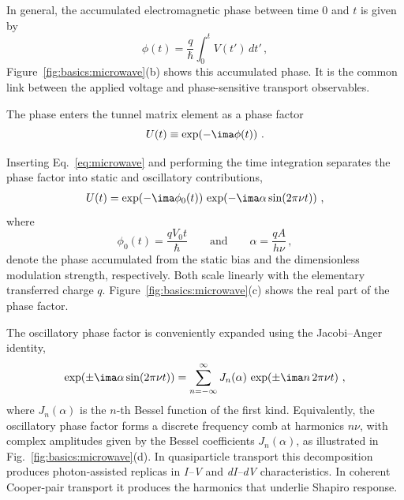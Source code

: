             In general, the accumulated electromagnetic phase between time $0$ and $t$ is given by
            \begin{equation}
                \phi(t) = \frac{q}{\hbar} \int_0^t V(t')\, dt'\,,
                \label{eq:basics:mw-phase}
            \end{equation}
            Figure~\ref{fig:basics:microwave}(b) shows this accumulated phase. It is the common link between the applied voltage and phase-sensitive transport observables.

            The phase enters the tunnel matrix element as a phase factor 
            \begin{equation}
                U(t)\equiv \exp\!\left(-\ima\phi(t)\right)\,.
                \label{eq:microwave:phase-factor}
            \end{equation}

            Inserting Eq.~\eqref{eq:microwave} and performing the time integration separates the phase factor into static and oscillatory contributions,
            \begin{align}
                U(t) = \exp\!\left(-\ima \phi_0(t)\right)\,
                \exp\!\left(-\ima \alpha \sin(2\pi\nu t)\right)\,,
                \label{eq:basics:mw-phase-decomposition}
            \end{align}
            where
            \begin{equation}
                \phi_0(t) = \frac{q V_0 t}{\hbar}
                \qquad\text{and}\qquad
                \alpha = \frac{q A}{h\nu}\,,
                \label{eq:basics:mw-drive-parameters}
            \end{equation}
            denote the phase accumulated from the static bias and the dimensionless modulation strength, respectively. Both scale linearly with the elementary transferred charge $q$. Figure~\ref{fig:basics:microwave}(c) shows the real part of the phase factor.

            The oscillatory phase factor is conveniently expanded using the Jacobi--Anger identity,
            \begin{equation}
                \exp\!\left(\pm\ima\alpha \sin(2\pi\nu t)\right)
                = \sum_{n=-\infty}^{\infty} J_n(\alpha)\,
                \exp\!\left(\pm\ima n\, 2\pi\nu t\right)\,,
                \label{eq:microwave:jacobi-anger}
            \end{equation}
            where $J_n(\alpha)$ is the $n$-th Bessel function of the first kind. Equivalently, the oscillatory phase factor forms a discrete frequency comb at harmonics $n\nu$, with complex amplitudes given by the Bessel coefficients $J_n(\alpha)$, as illustrated in Fig.~\ref{fig:basics:microwave}(d). In quasiparticle transport this decomposition produces photon-assisted replicas in \textit{I--V} and \textit{dI--dV} characteristics. In coherent Cooper-pair transport it produces the harmonics that underlie Shapiro response.

